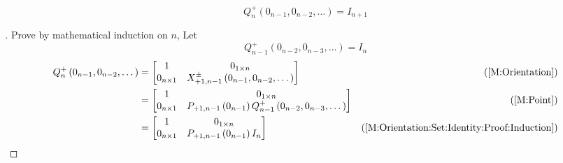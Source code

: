 \documentclass[../main.tex]{subfiles}
\begin{document}
\begin{corollary}\label{M:Orientation:Set:Identity}
    \begin{equation*}
        Q^{+}_{n}
        \left(0_{n-1}, 0_{n-2}, \dots\right)
        =
        I_{n+1}
    \end{equation*}
\end{corollary}
\begin{proof}[]
    Prove by mathematical induction on $n$,
    Let
    \begin{equation}\label{M:Orientation:Set:Identity:Proof:Induction}
        Q^+_{n-1}\left(0_{n-2}, 0_{n-3}, \dots\right)=I_n
    \end{equation}
    \begin{align*}
        Q^+_n\left(0_{n-1}, 0_{n-2}, \dots\right)
                                                                                                       & =
        \begin{bmatrix}
            1             & 0_{1\times n}                                    \\
            0_{n\times 1} & X^\pm_{+1,n-1}\left(0_{n-1},0_{n-2},\dots\right) \\
        \end{bmatrix}                            & \text{(\cref{M:Orientation})}                                                               \\
                                                                                                       & =
        \begin{bmatrix}
            1             & 0_{1\times n}                                                               \\
            0_{n\times 1} & P_{+1,n-1}\left(0_{n-1}\right)Q^+_{n-1}\left(0_{n-2}, 0_{n-3}, \dots\right) \\
        \end{bmatrix} & \text{(\cref{M:Point})}                                            \\
                                                                                                       & =
        \begin{bmatrix}
            1             & 0_{1\times n}                      \\
            0_{n\times 1} & P_{+1,n-1}\left(0_{n-1}\right) I_n \\
        \end{bmatrix}                                          & \text{(\cref{M:Orientation:Set:Identity:Proof:Induction})}                    \\

\end{align*}
\end{proof}
\end{document}
